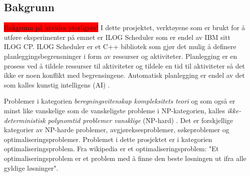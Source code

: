 \subsection{Bakgrunn}
\colorbox{red}{Bakgrunn på utvides yterligere!}
I dette prosjektet, verktøyene som er brukt for å utføre eksperimenter på emnet er ILOG Scheduler som er endel av IBM sitt ILOG CP. ILOG Scheduler er et C++ bibliotek som gjør det mulig å definere planleggingsbegrensninger i form av ressurser og aktiviteter. Planlegging er en prosess ved å tildele ressurser til aktiviteter og tildele en tid til aktiviteter så det ikke er noen konflikt med begrensingene.\cite{Pape94implementationof} Automatisk planlegging er endel av det som kalles kunstig intelligens (AI) .

Problemer i kategorien \textit{beregningsvitenskap kompleksitets teori}\cite{compcomplextheory} og som også er minst like vanskelige som de vanskeligste probleme i NP-kategorien, kalles \textit{ikke-deterministisk polynomtid problemer vansklige} (NP-hard) . Det er forskjellige kategorier av NP-harde problemer, avgjøreksesproblemer, søkeproblemer og optimaliseringsproblemer. \cite{nphardwikipedia} Problemet i dette prosjektet er i kategorien optimaliseringsproblem. Fra wikipedia \cite{optimizationproblemwiki} er et optimaliseringsproblem: "Et optimaliseringsproblem er et problem med å finne den beste løsningen ut ifra alle gyldige løsninger".

